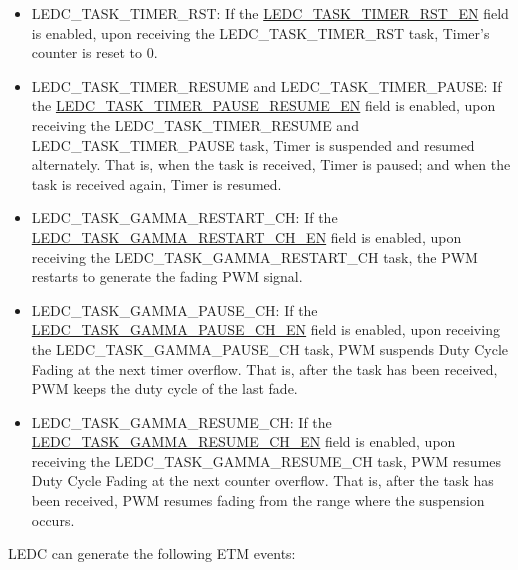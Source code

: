 \documentclass[main\_\_EN.tex]{subfiles}
\begin{document}
\begin{itemize}
\item LEDC\_TASK\_TIMER\_RST: If the \hyperref[fielddesc:LEDCTASKTIMERNRSTEN]{LEDC\_TASK\_TIMER\_RST\_EN} field is enabled, upon receiving the LEDC\_TASK\_TIMER\_RST task, Timer's counter is reset to 0.
\item LEDC\_TASK\_TIMER\_RESUME and LEDC\_TASK\_TIMER\_PAUSE: If the \hyperref[fielddesc:LEDCTASKTIMERNPAUSERESUMEEN]{LEDC\_TASK\_TIMER\_PAUSE\_RESUME\_EN} field is enabled, upon receiving the LEDC\_TASK\_TIMER\_RESUME and LEDC\_TASK\_TIMER\_PAUSE task, Timer is suspended and resumed alternately. That is, when the task is received, Timer is paused; and when the task is received again, Timer is resumed.
\item LEDC\_TASK\_GAMMA\_RESTART\_CH: If the \hyperref[fielddesc:LEDCTASKGAMMARESTARTCHNEN]{LEDC\_TASK\_GAMMA\_RESTART\_CH\_EN} field is enabled, upon receiving the LEDC\_TASK\_GAMMA\_RESTART\_CH task, the PWM restarts to generate the fading PWM signal.
\item LEDC\_TASK\_GAMMA\_PAUSE\_CH: If the \hyperref[fielddesc:LEDCTASKGAMMAPAUSECHNEN]{LEDC\_TASK\_GAMMA\_PAUSE\_CH\_EN} field is enabled, upon receiving the LEDC\_TASK\_GAMMA\_PAUSE\_CH task, PWM suspends Duty Cycle Fading at the next timer overflow. That is, after the task has been received, PWM keeps the duty cycle of the last fade.
\item LEDC\_TASK\_GAMMA\_RESUME\_CH: If the \hyperref[fielddesc:LEDCTASKGAMMARESUMECHNEN]{LEDC\_TASK\_GAMMA\_RESUME\_CH\_EN} field is enabled, upon receiving the LEDC\_TASK\_GAMMA\_RESUME\_CH task, PWM resumes Duty Cycle Fading at the next counter overflow. That is, after the task has been received, PWM resumes fading from the range where the suspension occurs.
\end{itemize}

LEDC can generate the following ETM events:
\end{document}
